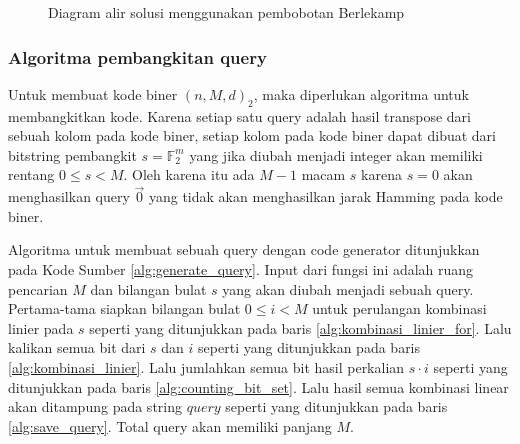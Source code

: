 \begin{figure}
\centering
{}
\caption{Diagram alir solusi menggunakan pembobotan Berlekamp}
\label{fig:flow_binarycode}
\end{figure}


\subsubsection{Algoritma pembangkitan query}

Untuk membuat kode biner $(n,M,d)_2$, maka diperlukan algoritma untuk membangkitkan kode. Karena setiap satu query adalah hasil transpose dari sebuah kolom pada kode biner, setiap kolom pada kode biner dapat dibuat dari bitstring pembangkit $s = \mathbb{F}_2^m$ yang jika diubah menjadi integer akan memiliki rentang $0 \leq s < M$. Oleh karena itu ada $M-1$ macam $s$ karena $s=0$ akan menghasilkan query $\vec{0}$ yang tidak akan menghasilkan jarak Hamming pada kode biner.

Algoritma untuk membuat sebuah query dengan code generator ditunjukkan pada Kode Sumber \ref{alg:generate_query}. Input dari fungsi ini adalah ruang pencarian $M$ dan bilangan bulat $s$ yang akan diubah menjadi sebuah query. Pertama-tama siapkan bilangan bulat $0 \leq i < M$ untuk perulangan kombinasi linier pada $s$ seperti yang ditunjukkan pada baris \ref{alg:kombinasi_linier_for}. Lalu kalikan semua bit dari $s$ dan $i$ seperti yang ditunjukkan pada baris \ref{alg:kombinasi_linier}. Lalu jumlahkan semua bit hasil perkalian $s \cdot i$ seperti yang ditunjukkan pada baris \ref{alg:counting_bit_set}. Lalu hasil semua kombinasi linear akan ditampung pada string $query$ seperti yang ditunjukkan pada baris \ref{alg:save_query}. Total query akan memiliki panjang $M$.

